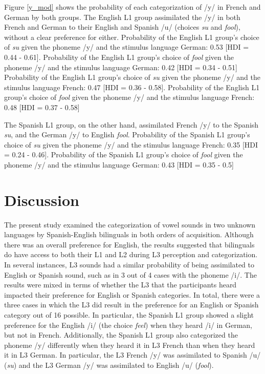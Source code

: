 \documentclass[preprints]{Definitions/mdpi}
\begin{document}
Figure \ref{y_mod} shows the probability of each categorization of /y/ in French and German by both groups.
The English L1 group assimilated the /y/ in both French and German to their English and Spanish /u/ (choices \emph{su} and \emph{fool}), without a clear preference for either.
Probability of the English L1 group's choice of \emph{su} given the phoneme /y/ and the stimulus language German: 0.53 {[}HDI = 0.44 - 0.61{]}.
Probability of the English L1 group's choice of \emph{fool} given the phoneme /y/ and the stimulus language German: 0.42 {[}HDI = 0.34 - 0.51{]}
Probability of the English L1 group's choice of \emph{su} given the phoneme /y/ and the stimulus language French: 0.47 {[}HDI = 0.36 - 0.58{]}.
Probability of the English L1 group's choice of \emph{fool} given the phoneme /y/ and the stimulus language French: 0.48 {[}HDI = 0.37 - 0.58{]}

The Spanish L1 group, on the other hand, assimilated French /y/ to the Spanish \emph{su}, and the German /y/ to English \emph{fool}. Probability of the Spanish L1 group's choice of \emph{su} given the phoneme /y/ and the stimulus language French: 0.35 {[}HDI = 0.24 - 0.46{]}. Probability of the Spanish L1 group's choice of \emph{fool} given the phoneme /y/ and the stimulus language German: 0.43 {[}HDI = 0.35 - 0.5{]}

\section{Discussion}

The present study examined the categorization of vowel sounds in two unknown languages by Spanish-English bilinguals in both orders of acquisition.
Although there was an overall preference for English, the results suggested that bilinguals do have access to both their L1 and L2 during L3 perception and categorization.
In several instances, L3 sounds had a similar probability of being assimilated to English or Spanish sound, such as in 3 out of 4 cases with the phoneme /i/.
The results were mixed in terms of whether the L3 that the participants heard impacted their preference for English or Spanish categories.
In total, there were a three cases in which the L3 did result in the preference for an English or Spanish category out of 16 possible.
In particular, the Spanish L1 group showed a slight preference for the English /i/ (the choice \emph{feel}) when they heard /i/ in German, but not in French.
Additionally, the Spanish L1 group also categorized the phoneme /y/ differently when they heard it in L3 French than when they heard it in L3 German.
In particular, the L3 French /y/ was assimilated to Spanish /u/ (\emph{su}) and the L3 German /y/ was assimilated to English /u/ (\emph{fool}).
\end{document}
